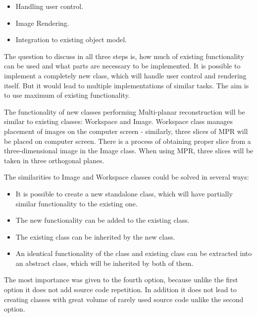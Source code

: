 \begin{itemize}
\item Handling user control. %
\item Image Rendering. %
\item Integration to existing object model. %
\end{itemize}

The question to discuss in all three steps is, how much of existing functionality can be used and what parts are necessary to be implemented. It is possible to implement a completely new class, which will handle user control and rendering itself. But it would lead to multiple implementations of similar tasks. The aim is to use maximum of existing functionality.

The functionality of new classes performing Multi-planar reconstruction will be similar to existing classes: Workspace and Image. Workspace class manages placement of images on the computer screen - similarly, three slices of MPR will be placed on computer screen. There is a process of obtaining proper slice from a three-dimensional image in the Image class. When using MPR, three slices will be taken in three orthogonal planes.

The similarities to Image and Workspace classes could be solved in several ways:

\begin{itemize}
\item It is possible to create a new standalone class, which will have partially similar functionality to the existing one.
\item The new functionality can be added to the existing class.
\item The existing class can be inherited by the new class.
\item An identical functionality of the class and existing class can be extracted into an abstract class, which will be inherited by both of them.
\end{itemize}

The most importance was given to the fourth option, because unlike the first option it does not add source code repetition. In addition it does not lead to creating classes with great volume of rarely used source code unlike the second option.

